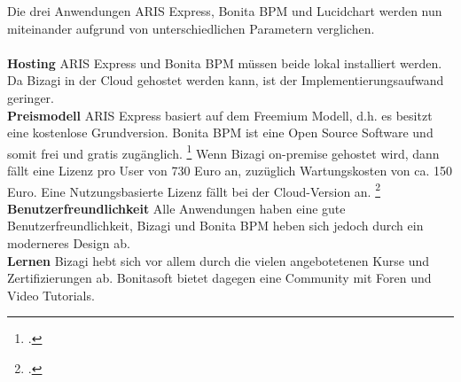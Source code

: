 Die drei Anwendungen ARIS Express, Bonita BPM und Lucidchart werden nun
miteinander aufgrund von unterschiedlichen Parametern verglichen.
\\
\\
\textbf{Hosting} ARIS Express und Bonita BPM müssen beide lokal installiert
werden. Da Bizagi in der Cloud gehostet werden kann, ist der
Implementierungsaufwand geringer.
\\
\textbf{Preismodell} ARIS Express basiert  auf dem Freemium
Modell, d.h. es besitzt eine kostenlose Grundversion. Bonita BPM ist eine Open
Source Software und somit frei und gratis zugänglich. \footcite{bonitasource}
Wenn Bizagi on-premise gehostet wird, dann fällt eine Lizenz pro User von 730 Euro an, zuzüglich
Wartungskosten von ca. 150 Euro. Eine Nutzungsbasierte Lizenz fällt bei der
Cloud-Version an. \footcite{bizagiprizing}
\\
\textbf{Benutzerfreundlichkeit} Alle Anwendungen haben eine gute
Benutzerfreundlichkeit, Bizagi und Bonita BPM heben sich jedoch durch ein
moderneres Design ab.
\\
\textbf{Lernen} Bizagi hebt sich vor allem durch die vielen angebotetenen Kurse
und Zertifizierungen ab. Bonitasoft bietet dagegen eine Community mit Foren und
Video Tutorials. 

\begin{figure}[H]
\begin{minipage}{\linewidth}
\begin{center}
\end{center}
\end{minipage}
\end{figure}


